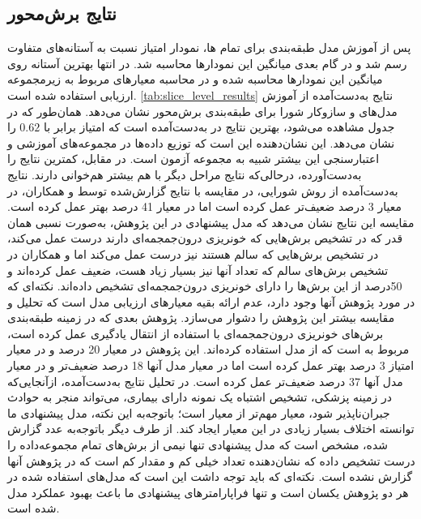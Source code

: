 \subsection{نتایج برش‌محور }
پس از آموزش مدل طبقه‌بندی برای تمام 
ها،
نمودار امتیاز
نسبت‌ به آستانه‌های متفاوت رسم شد و در گام بعدی میانگین این نمودارها محاسبه شد. در انتها بهترین آستانه روی میانگین این نمودار‌ها محاسبه شده و در محاسبه معیارهای مربوط به زیرمجموعه ارزیابی استفاده شده است.
 \autoref{tab:slice_level_results}
  نتایج به‌دست‌آمده از آموزش مدل‌های  و سازوکار شورا برای طبقه‌بندی برش‌محور نشان می‌دهد. همان‌طور که در جدول مشاهده می‌شود، بهترین نتایج در
  به‌دست‌آمده است که امتیاز 
   برابر با
  $0.62$
 را نشان می‌دهد. این نشان‌دهنده این است که توزیع داده‌ها در مجموعه‌های آموزشی و اعتبارسنجی این 
  بیشتر شبیه به مجموعه آزمون است. در مقابل، 
   کمترین نتایج را به‌دست‌آورده، درحالی‌که نتایج مراحل دیگر با هم بیشتر هم‌خوانی دارند. نتایج به‌دست‌آمده از روش شورایی، در مقایسه با نتایج گزارش‌شده توسط
   \cite{hssayeni2020intracranial}
   و همکاران، در معیار
3 درصد ضعیف‌تر عمل کرده ‌است اما در معیار
41 درصد بهتر عمل کرده است. مقایسه این نتایج نشان می‌دهد که مدل پیشنهادی در این پژوهش، به‌صورت نسبی همان قدر که در تشخیص برش‌هایی که خونریزی درون‌جمجمه‌ای دارند درست عمل می‌کند، در تشخیص برش‌هایی که سالم هستند نیز درست عمل می‌‌کند اما 
و همکاران در تشخیص برش‌های سالم که تعداد آنها نیز بسیار زیاد هست،‌ ضعیف عمل کرده‌اند و 50درصد از این برش‌ها را دارای خونریزی درون‌جمجمه‌ای تشخیص داده‌اند. نکته‌ای که در مورد پژوهش آنها وجود دارد،‌ عدم ارائه بقیه معیارهای ارزیابی مدل است که تحلیل و مقایسه‌ بیشتر این پژوهش را دشوار می‌سازد.
پژوهش بعدی که در زمینه طبقه‌بندی برش‌های خونریزی درون‌جمجمه‌ای با استفاده از انتقال یادگیری عمل کرده است، مربوط به 
\cite{neethi2022stroke}
است که از مدل 
استفاده کرده‌اند. این پژوهش در معیار
20 درصد و در معیار امتیاز
3 درصد بهتر عمل کرده ‌است اما در معیار 
مدل آنها 18 درصد ضعیف‌تر و در معیار 
مدل آنها 37 درصد ضعیف‌تر عمل کرده است. در تحلیل نتایج به‌دست‌آمده، از‌آنجایی‌که در زمینه پزشکی، تشخیص اشتباه یک نمونه دارای بیماری،‌ می‌تواند منجر به حوادث جبران‌ناپذیر شود، معیار 
مهم‌تر از معیار 
است؛ باتوجه‌به این نکته،‌ مدل پیشنهادی ما توانسته اختلاف بسیار زیادی در این معیار ایجاد کند. از طرف دیگر با‌توجه‌به عدد 
گزارش شده، مشخص است که مدل پیشنهادی 
تنها نیمی از برش‌های تمام مجموعه‌داده را درست تشخیص داده که نشان‌دهنده تعداد خیلی کم 
و مقدار کم 
است که در پژوهش آنها گزارش نشده است. نکته‌ای که باید توجه داشت این است که مدل‌های استفاده شده در هر دو پژوهش یکسان است و تنها فراپارامتر‌های پیشنهادی ما باعث بهبود عملکرد مدل شده است.


